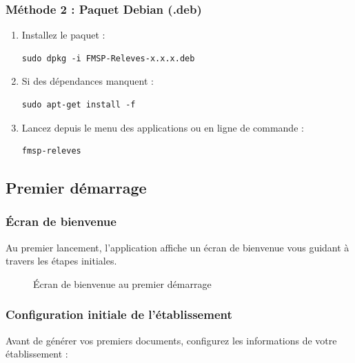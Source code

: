 \subsubsection{Méthode 2 : Paquet Debian (.deb)}

\begin{enumerate}[leftmargin=*]
    \item Installez le paquet :
    \begin{verbatim}
sudo dpkg -i FMSP-Releves-x.x.x.deb
    \end{verbatim}
    \item Si des dépendances manquent :
    \begin{verbatim}
sudo apt-get install -f
    \end{verbatim}
    \item Lancez depuis le menu des applications ou en ligne de commande :
    \begin{verbatim}
fmsp-releves
    \end{verbatim}
\end{enumerate}

\subsection{Premier démarrage}

\subsubsection{Écran de bienvenue}

Au premier lancement, l'application affiche un écran de bienvenue vous guidant à travers les étapes initiales.

\begin{figure}[h]
    \centering
    \caption{Écran de bienvenue au premier démarrage}
\end{figure}

\subsubsection{Configuration initiale de l'établissement}

Avant de générer vos premiers documents, configurez les informations de votre établissement :

